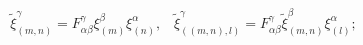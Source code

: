 \begin{equation}
\tilde{\xi}_{(m,n)}^{\gamma }=F_{\alpha \beta }^{\gamma }\xi _{(m)}^{\beta
}\xi _{(n)}^{\alpha },\;\;\;\tilde{\xi}_{((m,n),l)}^{\gamma }=F_{\alpha
\beta }^{\gamma }\tilde{\xi}_{(m,n)}^{\beta }\xi _{(l)}^{\alpha };
\label{param4}
\end{equation}

